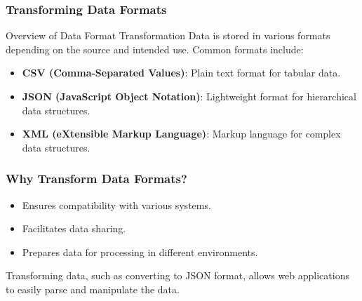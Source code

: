 \documentclass[aspectratio=169]{beamer}
\begin{document}
\begin{frame}
    \frametitle{Transforming Data Formats}
    \begin{block}{Overview of Data Format Transformation}
        Data is stored in various formats depending on the source and intended use. Common formats include:
    \end{block}
    \begin{itemize}
        \item \textbf{CSV (Comma-Separated Values)}: Plain text format for tabular data.
        \item \textbf{JSON (JavaScript Object Notation)}: Lightweight format for hierarchical data structures.
        \item \textbf{XML (eXtensible Markup Language)}: Markup language for complex data structures.
    \end{itemize}
\end{frame}

\begin{frame}
    \frametitle{Why Transform Data Formats?}
    \begin{itemize}
        \item Ensures compatibility with various systems.
        \item Facilitates data sharing.
        \item Prepares data for processing in different environments.
    \end{itemize}
    Transforming data, such as converting to JSON format, allows web applications to easily parse and manipulate the data.
\end{frame}
\end{document}
